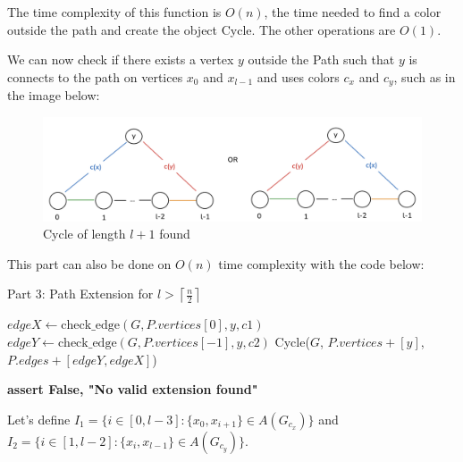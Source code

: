 The time complexity of this function is $O(n)$, the time needed
to find a color outside the path and create the object Cycle. The other
operations are $O(1)$.

We can now check if there exists a vertex $y$ outside the Path
such that $y$ is connects to the path on vertices $x_0$ and $x_{l-1}$
and uses colors $c_x$ and $c_y$, such as in the image below:

\begin{figure}[H]
    \centering
    \includegraphics[width=1\textwidth]{figuras/path_vertex_outside.png}
    \caption{Cycle of length \( l + 1 \) found}
    \label{fig:path_vertex_outside}
\end{figure}

This part can also be done on $O(n)$ time complexity with
the code below:

\begin{algorithm}[H]
    \caption{Part 3: Path Extension for \( l > \left \lceil \frac{n}{2} \right \rceil \)}
    \begin{algorithmic}
            \For{$[c1, c2] \in [[cx, cy], [cy, cx]]$} 
                        \State $edgeX \gets \text{check\_edge}(G, P.vertices[0], y, c1)$
                        \State $edgeY \gets \text{check\_edge}(G, P.vertices[-1], y, c2)$
                            \State \Return Cycle($G$, $P.vertices + [y]$, $P.edges + [edgeY, edgeX]$)
                        \EndIf
                    \EndIf
                \EndFor
            \EndFor

            \State \textbf{assert False, "No valid extension found"}
        \EndFunction
    \end{algorithmic}
\end{algorithm}

Let's define $I_1 = \{i \in [0, l - 3]: \{x_0, x_{i + 1}\} \in A(G_{c_x})\}$ and 
$I_2 = \{i \in [1, l - 2]: \{x_i, x_{l-1}\} \in A(G_{c_y})\}$.

